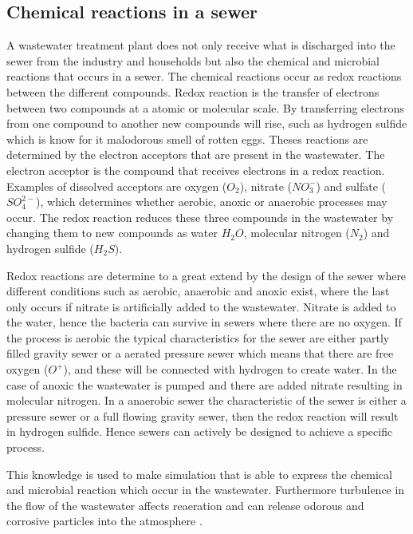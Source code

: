 \subsection{Chemical reactions in a sewer}\label{subse:chemical_reactions_in_a_sewer}
A wastewater treatment plant does not only receive what is discharged into the sewer from the industry and households but also the chemical and microbial reactions that occurs in a sewer. The chemical reactions occur as redox reactions between the different compounds. Redox reaction is the transfer of electrons between two compounds at a atomic or molecular scale. By transferring electrons from one compound to another new compounds will rise, such as hydrogen sulfide which is know for it malodorous smell of rotten eggs. Theses reactions are determined by the electron acceptors that are present in the wastewater. The electron acceptor is the compound that receives electrons in a redox reaction. Examples of dissolved acceptors are oxygen ($O_2$), nitrate ($NO^-_3$) and sulfate ($SO^{2-}_4$), which determines whether aerobic, anoxic or anaerobic processes may occur. The redox reaction reduces these three compounds in the wastewater by changing them to new compounds as water $H_2O$, molecular nitrogen ($N_2$) and hydrogen sulfide ($H_2S$). 

Redox reactions are determine to a great extend by the design of the sewer where different conditions such as aerobic, anaerobic and anoxic exist, where the last only occurs if nitrate is artificially added to the wastewater. Nitrate is added to the water, hence the bacteria can survive in sewers where there are no oxygen. If the process is aerobic the typical characteristics for the sewer are either partly filled gravity sewer or a aerated pressure sewer which means that there are free oxygen ($O^+$), and these will be connected with hydrogen to create water. In the case of anoxic the wastewater is pumped and there are added nitrate resulting in molecular nitrogen. In a anaerobic sewer the characteristic of the sewer is either a pressure sewer or a full flowing gravity sewer, then the redox reaction will result in hydrogen sulfide. Hence sewers can actively be designed to achieve a specific process. 

This knowledge is used to make simulation that is able to express the chemical and microbial reaction which occur in the wastewater. Furthermore turbulence in the flow of the wastewater affects reaeration and can release odorous and corrosive particles into the atmosphere \cite{Sewer_processes}.    

